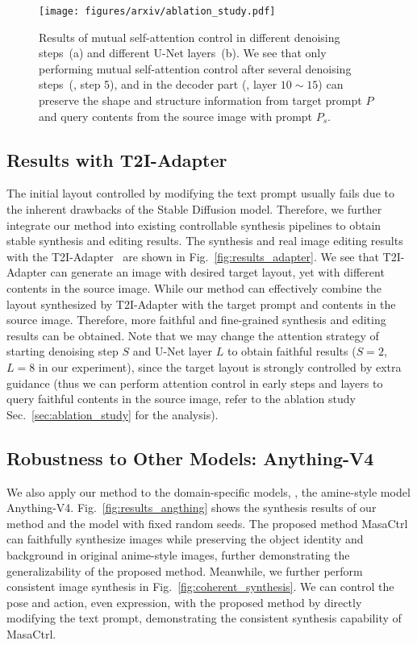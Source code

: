 \documentclass[10pt,twocolumn,letterpaper]{article}
\begin{document}
\begin{figure*}[!t]
    \centering
    \texttt{[image: figures/arxiv/ablation\_study.pdf]}
    \caption{Results of mutual self-attention control in different denoising steps~(a) and different U-Net layers~(b). We see that only performing mutual self-attention control after several denoising steps~(\eg, step 5), and in the decoder part (\eg, layer $10\sim 15$) can preserve the shape and structure information from target prompt $P$ and query contents from the source image with prompt $P_s$.}
    \label{fig:step_layer_analysis}
\end{figure*}

\subsection{Results with T2I-Adapter}
The initial layout controlled by modifying the text prompt usually fails due to the inherent drawbacks of the Stable Diffusion model. Therefore, we further integrate our method into existing controllable synthesis pipelines to obtain stable synthesis and editing results. The synthesis and real image editing results with the T2I-Adapter~\cite{mou2023t2i} are shown in Fig.~\ref{fig:results_adapter}. We see that T2I-Adapter can generate an image with desired target layout, yet with different contents in the source image. While our method can effectively combine the layout synthesized by T2I-Adapter with the target prompt and contents in the source image. Therefore, more faithful and fine-grained synthesis and editing results can be obtained. Note that we may change the attention strategy of starting denoising step $S$ and U-Net layer $L$ to obtain faithful results ($S=2$, $L=8$ in our experiment), since the target layout is strongly controlled by extra guidance (thus we can perform attention control in early steps and layers to query faithful contents in the source image, refer to the ablation study Sec.~\ref{sec:ablation_study} for the analysis). 

\subsection{Robustness to Other Models: Anything-V4}

We also apply our method to the domain-specific models, \ie, the amine-style model Anything-V4. Fig.~\ref{fig:results_angthing} shows the synthesis results of our method and the model with fixed random seeds. The proposed method MasaCtrl can faithfully synthesize images while preserving the object identity and background in original anime-style images, further demonstrating the generalizability of the proposed method. 
Meanwhile, we further perform consistent image synthesis in Fig.~\ref{fig:coherent_synthesis}. We can control the pose and action, even expression, with the proposed method by directly modifying the text prompt, demonstrating the consistent synthesis capability of MasaCtrl.
\end{document}
